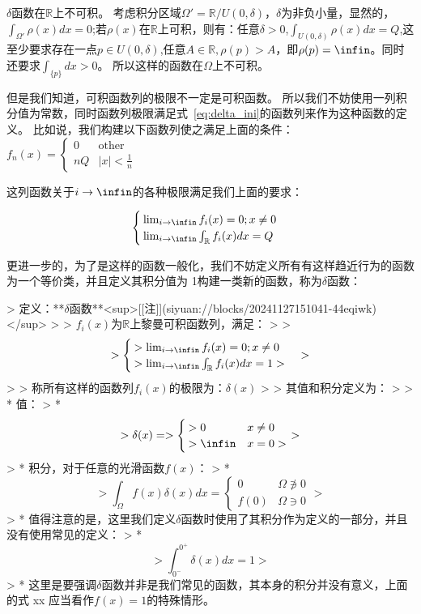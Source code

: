 \documentclass[lang=cn,10pt,newtx,bibend=biber,device=pad]{elegantbook}
\begin{document}
\begin{lemma}[不可积性]
    $\delta$函数在$\mathbb{R}$上不可积。
    考虑积分区域$\Omega' = \mathbb{R}/U(0,\delta)$，$\delta$为非负小量，显然的，$\int_{\Omega'}\rho(x)dx= 0$;若$\rho(x)$在$\mathbb{R}$上可积，则有：任意$\delta>0$,$\int_{U(0,\delta)}\rho(x)dx=Q$,这至少要求存在一点$p\in U(0,\delta)$,任意$A \in \mathbb{R},\rho(p)>A$，即$\rho(p)= \infin$。同时还要求$\int_{\{p\}} dx > 0$。
    所以这样的函数在$\Omega$上不可积。
\end{lemma}
但是我们知道，可积函数列的极限不一定是可积函数。
所以我们不妨使用一列积分值为常数，同时函数列极限满足式~\ref{eq:delta_ini}的函数列来作为这种函数的定义。
比如说，我们构建以下函数列使之满足上面的条件：$f_n(x) =  \begin{cases} 0 &\text{other}\\ nQ &\text{$|x|<\frac{1}{n}$}  \end{cases}$

这列函数关于$i\rightarrow \infin$的各种极限满足我们上面的要求：

\begin{equation}
\begin{cases}
\lim_{i\rightarrow\infin}f_i(x)=0;x\neq0\\
\lim_{i\rightarrow\infin}\int_{\mathbb{R}}f_i(x)dx = Q
\end{cases}
\end{equation}

更进一步的，为了是这样的函数一般化，我们不妨定义所有有这样趋近行为的函数为一个等价类，并且定义其积分值为 1构建一类新的函数，称为$\delta$函数：

> 定义：**$\delta$函数**​<sup>[[注]](siyuan://blocks/20241127151041-44eqiwk)</sup>
>
> ${f_i(x)}$为$\mathbb{R}$上黎曼可积函数列，满足：
>
> $$
> \begin{cases}
> \lim_{i\rightarrow\infin}f_i(x)=0;x\neq0\\
> \lim_{i\rightarrow\infin}\int_{\mathbb{R}}f_i(x)dx = 1
> \end{cases}
> $$
>
> 称所有这样的函数列${f_i(x)}$的极限为：$\delta(x)$
>
> 其值和积分定义为：
>
> * 值：
> * $$
>   \delta(x)=
>   \begin{cases}
>   0 &x\neq0 \\
>   \infin &x=0
>   \end{cases}
>   $$
> * 积分，对于任意的光滑函数$f(x)$：
> * $$
>   \int_{\Omega}f(x)\delta(x)dx=\begin{cases}0 & \Omega\not\owns0\\f(0)&\Omega\owns 0\end{cases}
>   $$
> * 值得注意的是，这里我们定义$\delta$函数时使用了其积分作为定义的一部分，并且没有使用常见的定义：
> * $$
>   \int_{0^-}^{0^+}\delta(x)dx=1
>   $$
> * 这里是要强调$\delta$函数并非是我们常见的函数，其本身的积分并没有意义，上面的式 xx 应当看作$f(x)=1$的特殊情形。
\end{document}
